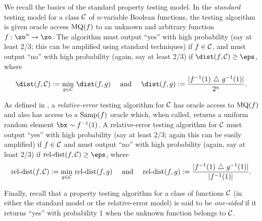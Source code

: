 \documentclass[11pt]{article}
\theoremstyle{definition}
\begin{document}
We recall the basics of the standard property testing model.  In the {\it standard} testing model for a class ${\cal C}$ of $n$-variable Boolean functions, the testing algorithm is given oracle access $\mathrm{MQ}(f)$ to an unknown and arbitrary function $f: \zo^n \to \zo$.
The algorithm must output ``yes'' with high probability (say at least 2/3; this can be amplified using standard techniques) if $f \in {\cal C}$, and must output ``no'' with high probability (again, say at least 2/3) if $\dist(f,{\cal C}) \geq \eps$, where
$$\dist(f,{\cal C}):=\min_{g \in {\cal C}}\hspace{0.05cm}\dist(f,g)\ \quad\text{and}\ \quad 
\dist(f,g) := {\frac {|f^{-1}(1) \ \triangle \ g^{-1}(1)|}{2^n}}.
$$

As defined in \cite{CDHLNSY2024}, a \emph{relative-error} testing algorithm for ${\cal C}$ has oracle access to $\mathrm{MQ}(f)$ and also has access to a $\mathrm{Samp}(f)$ oracle which, when called, returns a uniform random element $\bx \sim f^{-1}(1)$.
A relative-error testing algorithm for ${\cal C}$ must output ``yes'' with high probability (say at least 2/3; again this can be easily amplified) if $f \in {\cal C}$ and must output ``no'' with high probability (again, say at least 2/3) if $\reldist(f,{\cal C}) \geq \eps$, where
$$\reldist(f,{\cal C}):=\min_{g \in {\cal C}}\hspace{0.05cm}\reldist(f,g)\ \quad\text{and}\ \quad 
\reldist(f,g) := {\frac {|f^{-1}(1) \ \triangle \ g^{-1}(1)|}{|f^{-1}(1)|}}.
$$

Finally, recall that a property testing algorithm for a class of functions ${\cal C}$ (in either the standard model or the relative-error model) is said to be \emph{one-sided} if it returns ``yes'' with probability 1 when the unknown function belongs to ${\cal C}$.
\end{document}
